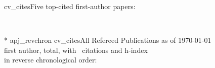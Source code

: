 \documentclass[12pt]{article}
\begin{document}

\vspace{-6pt}
{cv_cites}{Five top-cited first-author  papers:}

\vfill  
\nopagebreak

\newpage

\nocite{bibc}{*}
{apj_revchron}
{cv_cites}{All Refereed Publications as of \today\\
\nfirst first author, \nrefereed total, with \ncitestotal\ citations and h-index \hindex\\
in reverse chronological order:}
%





%
\end{document}
